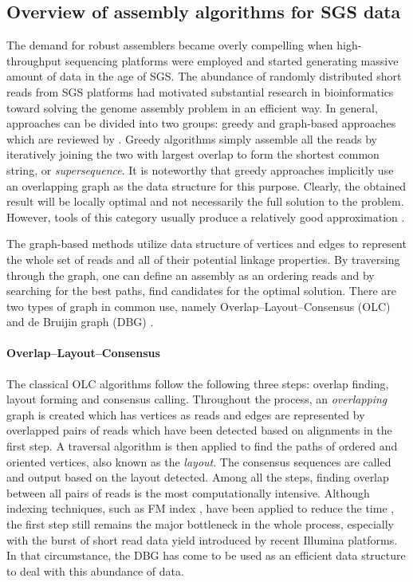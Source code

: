 \subsection{Overview of assembly algorithms for SGS data}
 
The demand for robust assemblers became overly compelling when high-throughput sequencing platforms were employed and started generating massive amount of data in the age of SGS.
The abundance of randomly distributed short reads from SGS platforms had motivated substantial research in bioinformatics toward solving the genome assembly problem in an efficient way\cite{Liu2012}. 
In general, approaches can be divided into two groups: greedy and graph-based approaches which are reviewed by \cite{MillerKS2010,LiZ2012}.
Greedy algorithms \cite{Sutton1995,Green1999,Huang1999} simply assemble all the reads by iteratively joining the two with largest overlap to form the shortest common string, or \emph{supersequence}.
It is noteworthy that greedy approaches implicitly use an overlapping graph as the data structure for this purpose. 
Clearly, the obtained result will be locally optimal and not necessarily the full solution to the problem. However, tools of this category usually produce a relatively good approximation \cite{Simpson2015}. 

The graph-based methods utilize data structure of vertices and edges to represent the whole set of reads and all of their potential linkage properties.
By traversing through the graph, one can define an assembly as an ordering reads and by searching for the best paths, find candidates for the optimal solution.
There are two types of graph in common use, namely Overlap--Layout--Consensus (OLC) \cite{Staden1979} and de Bruijin graph (DBG) \cite{Idury1995,PevznerTW2001}. 

\paragraph{Overlap--Layout--Consensus} The classical OLC algorithms follow the following three steps: overlap finding, layout forming and consensus calling. Throughout the process, an \emph{overlapping} graph is created which has vertices as reads and edges are represented by overlapped pairs of reads which have been detected based on alignments in the first step. A traversal algorithm is then applied to find the paths of ordered and oriented vertices, also known as the \emph{layout}. The consensus sequences are called and output based on the layout detected.
Among all the steps, finding overlap between all pairs of reads is the most computationally intensive. Although indexing techniques, such as FM index \cite{FerraginaM2005}, have been applied to reduce the time \cite{Ning2001}, the first step still remains the major bottleneck in the whole process, especially with the burst of short read data yield introduced by recent Illumina platforms.
In that circumstance, the DBG has come to be used as an efficient data structure to deal with this abundance of data. 

